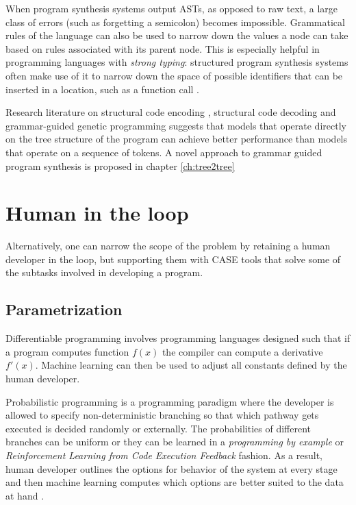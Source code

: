 When program synthesis systems output ASTs, as opposed to raw text, a large class of errors (such as forgetting a semicolon) becomes impossible. 
Grammatical rules of the language can also be used to narrow down the values a node can take based on rules associated with its parent node.
This is especially helpful in programming languages with \emph{strong typing}: structured program synthesis systems often make use of it to narrow down the space of possible identifiers that can be inserted in a location, such as a function call \cite{fengComponentbasedSynthesisComplex2017, guoProgramSynthesisTypeguided2020, oseraConstraintbasedTypedirectedProgram2019, peter-michaelProgramSynthesisTypes2015, polikarpovaProgramSynthesisPolymorphic2016}.

Research literature on structural code encoding \cite{alon2019structural,zhang2015tree}, structural code decoding \cite{jiang2021ast,zhu2019grammarcnn} and grammar-guided genetic programming \cite{bunelLeveragingGrammarReinforcement2018, manriqueGrammarguidedGeneticProgramming2009, sobaniaChallengesProgramSynthesis2020a} suggests that models that operate directly on the tree structure of the program can achieve better performance than models that operate on a sequence of tokens.
A novel approach to grammar guided program synthesis is proposed in chapter \ref{ch:tree2tree}

\newpage
\section{Human in the loop}
\label{sec:human}

Alternatively, one can narrow the scope of the problem by retaining a human developer in the loop, but supporting them with CASE \cite{caseComputeraidedSoftwareEngineering1985} tools that solve some of the subtasks involved in developing a program.

\subsection{Parametrization}

Differentiable programming \cite{blondelElementsDifferentiableProgramming2024} involves programming languages designed such that if a program computes function $f(x)$ the compiler can compute a derivative $f'(x)$. 
Machine learning can then be used to adjust all constants defined by the human developer.

Probabilistic programming \cite{gordonProbabilisticProgramming2014} is a programming paradigm where the developer is allowed to specify non-deterministic branching so that which pathway gets executed is decided randomly or externally.
The probabilities of different branches can be uniform or they can be learned in a \emph{programming by example} or \emph{Reinforcement Learning from Code Execution Feedback} fashion.
As a result, human developer outlines the options for behavior of the system at every stage and then machine learning computes which options are better suited to the data at hand \cite{gauntTerpreTProbabilisticProgramming2016}.

